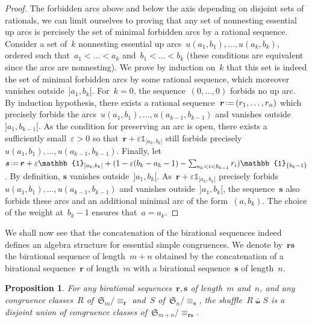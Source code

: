 \documentclass{amsart}
\newtheorem{proposition}[theorem]{Proposition}
\theoremstyle{definition}
\newcommand{\f}[1]{{\mathfrak{#1}}} %
\renewcommand{\b}[1]{{\boldsymbol{#1}}} %
\newcommand{\one}{{\mathbb{1}}} %
\newcommand{\shiftedShuffle}{\,\bar\shuffle\,} %
\newcommand{\eqdef}{\mbox{\,\raisebox{0.2ex}{\scriptsize\ensuremath{\mathrm:}}\ensuremath{=}\,}} %
\begin{document}
\begin{proof}
The forbidden arcs above and below the axis depending on disjoint sets of rationals, we can limit ourselves to proving that any set of nonnesting essential up arcs is percisely the set of minimal forbidden arcs by a rational sequence.
Consider a set of~$k$ nonnesting essential up arcs~$u(a_1, b_1), \dots, u(a_k, b_k)$, ordered such that~$a_1 < \dots < a_k$ and~$b_1 < \dots < b_k$ (these conditions are equivalent since the arcs are nonnesting).
We prove by induction on~$k$ that this set is indeed the set of minimal forbidden arcs by some rational sequence, which moreover vanishes outside~${]a_1, b_k[}$.
For~$k = 0$, the sequence~$(0, \dots, 0)$ forbids no up arc.
By induction hypothesis, there exists a rational sequence~$\b{r} \eqdef (r_1, \dots, r_n)$  which precisely forbids the arcs~$u(a_1,b_1), \dots, u(a_{k-1},b_{k-1})$ and vanishes outside~${]a_1, b_{k-1}[}$.
As the condition for preserving an arc is open, there exists a sufficiently small~${\varepsilon > 0}$ so that~$\b{r} + \varepsilon \one_{]a_k, b_k[}$ still forbids precisely~$u(a_1,b_1), \dots, u(a_{k-1},b_{k-1})$.
Finally, let~$\b{s} \eqdef \b{r} + \varepsilon \one_{]a_k, b_k[} + (1 - \varepsilon (b_k-a_k-1) - \sum_{a_k < i < b_{k-1}} r_i) \one_{\{b_k-1\}}$.
By definition, $\b{s}$ vanishes outside~${]a_1,b_k[}$.
As~$\b{r} + \varepsilon \one_{]a_k, b_k[}$ precisely forbids~$u(a_1,b_1), \dots, u(a_{k-1},b_{k-1})$ and vanishes outside~${]a_1, b_k[}$, the sequence~$\b{s}$ also forbids these arcs and an additional minimal arc of the form~$(a,b_k)$.
The choice of the weight at~$b_k-1$ ensures that~$a = a_k$.
\end{proof}

We shall now see that the concatenation of the birational sequences indeed defines an algebra structure for essential simple congruences.
We denote by~$\b{rs}$ the birational sequence of length~$m+n$ obtained by the concatenation of a birational sequence~$\b{r}$ of length~$m$ with a birational sequence~$\b{s}$ of length~$n$.

\begin{proposition}
\label{prop:product}
For any birational sequences~$\b{r}, \b{s}$ of length~$m$ and~$n$, and any congruence classes~$R$ of~$\f{S}_m/{\equiv_\b{r}}$ and~$S$ of~$\f{S}_n/{\equiv_\b{s}}$, the shuffle~$R \shiftedShuffle S$ is a disjoint union of congruence classes of~$\f{S}_{m+n}/{\equiv_\b{rs}}$.
\end{proposition}
\end{document}
